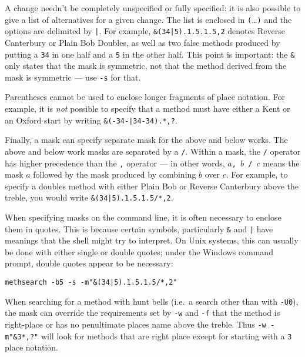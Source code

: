 \documentclass[a4paper,11pt,oneside]{book}
\makeatletter
\newcommand{\symidx}[2]{} %
\makeatother
\begin{document}
A change needn't be completely unspecified or fully specified: it is also
possible to give a list of alternatives for a given change.  The list is 
enclosed in \verb+(+\ldots\verb+)+ 
and the options are delimited by \verb+|+.\symidx{"|}{method mask}  
For example, \verb+&(34|5).1.5.1.5,2+ denotes Reverse Canterbury
or Plain Bob Doubles, as well as two false methods produced by putting a
\verb+34+ in one half and a \verb+5+ in the other half.  This point is 
important: the \verb+&+ only states that the mask is symmetric, not that
the method derived from the mask is symmetric --- use \verb+-s+ for that.

Parentheses cannot be used to enclose longer fragments of place notation.
For example, it is \textit{not} possible to specify that a method must have 
either a Kent or an Oxford 
start by writing \verb+&(-34-|34-34).*,?+.

Finally, a mask can specify separate mask for the above
and below works.  The above and below 
work masks are separated by a \verb+/+.\symidx{/}{method mask}
Within a mask, the \verb+/+ operator has higher 
precedence than the 
\verb+,+ operator --- in other words, 
\texttt{$a$, $b$ / $c$} means the mask $a$
followed by the mask produced by combining $b$ over $c$.  For example,
to specify a doubles method with either Plain Bob or Reverse Canterbury
above the treble, you would write \verb+&(34|5).1.5.1.5/*,2+.

When specifying masks on the command line, it is often necessary to enclose 
them in quotes.
This is because certain symbols, particularly \verb+&+ and
\verb+|+ have meanings that the shell might try to interpret.  On Unix systems,
this can usually be done with either single or double quotes; under the 
Windows command prompt, double quotes appear to be necessary:

\begin{Verbatim}
methsearch -b5 -s -m"&(34|5).1.5.1.5/*,2"
\end{Verbatim}

When searching for a method with hunt bells (i.e.\ a search other than with
\verb+-U0+), the mask can override the requirements set by \verb+-w+ and
\verb+-f+ that the method is right-place or has no penultimate places name
above the treble.  Thus \verb+-w -m"&3*,?"+ will look for methods
that are right place except for starting with a \verb+3+ place notation.  
\end{document}
